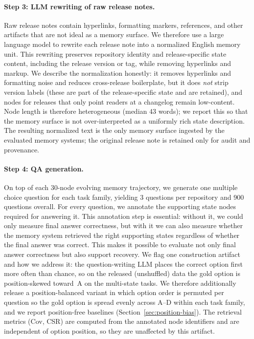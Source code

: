 \paragraph{Step 3: LLM rewriting of raw release notes.}
Raw release notes contain hyperlinks, formatting markers, references, and other artifacts that are not ideal as a memory surface. We therefore use a large language model to rewrite each release note into a normalized English memory unit. This rewriting preserves repository identity and release-specific state content, including the release version or tag, while removing hyperlinks and markup. We describe the normalization honestly: it removes hyperlinks and formatting noise and reduces cross-release boilerplate, but it does \emph{not} strip version labels (these are part of the release-specific state and are retained), and nodes for releases that only point readers at a changelog remain low-content. Node length is therefore heterogeneous (median 43 words); we report this so that the memory surface is not over-interpreted as a uniformly rich state description. The resulting normalized text is the only memory surface ingested by the evaluated memory systems; the original release note is retained only for audit and provenance.

\paragraph{Step 4: QA generation.}
On top of each 30-node evolving memory trajectory, we generate one multiple choice question for each task family, yielding 3 questions per repository and 900 questions overall. For every question, we annotate the supporting state nodes required for answering it. This annotation step is essential: without it, we could only measure final answer correctness, but with it we can also measure whether the memory system retrieved the right supporting states regardless of whether the final answer was correct. This makes it possible to evaluate not only final answer correctness but also support recovery. We flag one construction artifact and how we address it: the question-writing LLM places the correct option first more often than chance, so on the released (unshuffled) data the gold option is position-skewed toward~A on the multi-state tasks. We therefore additionally release a position-balanced variant in which option order is permuted per question so the gold option is spread evenly across A--D within each task family, and we report position-free baselines (Section~\ref{sec:position-bias}). The retrieval metrics (Cov, CSR) are computed from the annotated node identifiers and are independent of option position, so they are unaffected by this artifact.

